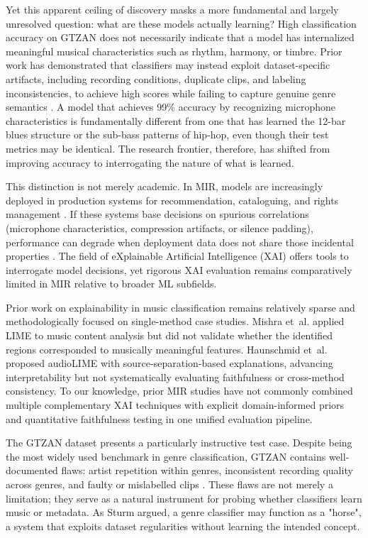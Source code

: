\documentclass{article}
\begin{document}
Yet this apparent ceiling of discovery masks a more fundamental and largely unresolved question: what are these models actually learning? High classification accuracy on GTZAN does not necessarily indicate that a model has internalized meaningful musical characteristics such as rhythm, harmony, or timbre. Prior work has demonstrated that classifiers may instead exploit dataset-specific artifacts, including recording conditions, duplicate clips, and labeling inconsistencies, to achieve high scores while failing to capture genuine genre semantics \cite{Sturm2016, sturm2013gtzan}. A model that achieves 99\% accuracy by recognizing microphone characteristics is fundamentally different from one that has learned the 12-bar blues structure or the sub-bass patterns of hip-hop, even though their test metrics may be identical. The research frontier, therefore, has shifted from improving accuracy to interrogating the nature of what is learned.

This distinction is not merely academic. In MIR, models are increasingly deployed in production systems for recommendation, cataloguing, and rights management \cite{Fu2011}. If these systems base decisions on spurious correlations (microphone characteristics, compression artifacts, or silence padding), performance can degrade when deployment data does not share those incidental properties \cite{Geirhos2020,Lapuschkin2019}. The field of eXplainable Artificial Intelligence (XAI) \cite{Arrieta2020} offers tools to interrogate model decisions, yet rigorous XAI evaluation remains comparatively limited in MIR relative to broader ML subfields.

Prior work on explainability in music classification remains relatively sparse and methodologically focused on single-method case studies. Mishra et~al. \cite{Mishra2017} applied LIME to music content analysis but did not validate whether the identified regions corresponded to musically meaningful features. Haunschmid et~al. \cite{Haunschmid2020} proposed audioLIME with source-separation-based explanations, advancing interpretability but not systematically evaluating faithfulness or cross-method consistency. To our knowledge, prior MIR studies have not commonly combined multiple complementary XAI techniques with explicit domain-informed priors and quantitative faithfulness testing in one unified evaluation pipeline.

The GTZAN dataset \cite{Tzanetakis2002} presents a particularly instructive test case. Despite being the most widely used benchmark in genre classification, GTZAN contains well-documented flaws: artist repetition within genres, inconsistent recording quality across genres, and faulty or mislabelled clips \cite{sturm2013gtzan}. These flaws are not merely a limitation; they serve as a natural instrument for probing whether classifiers learn music or metadata. As Sturm \cite{Sturm2014} argued, a genre classifier may function as a "horse", a system that exploits dataset regularities without learning the intended concept.
\end{document}
